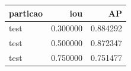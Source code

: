 \begin{tabular}{lrr}
\toprule
particao & iou & AP \\
\midrule
test & 0.300000 & 0.884292 \\
test & 0.500000 & 0.872347 \\
test & 0.750000 & 0.751477 \\
\bottomrule
\end{tabular}
